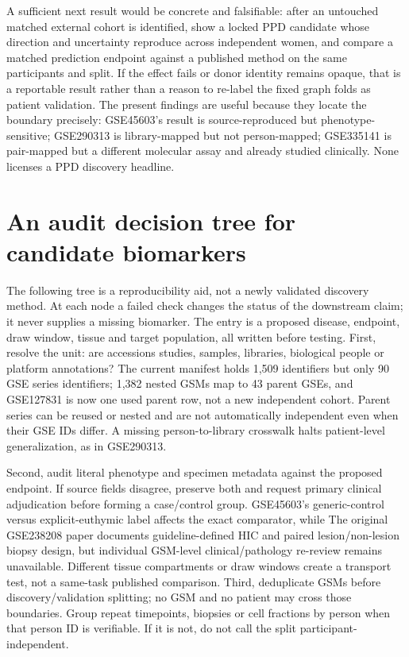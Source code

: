 \documentclass[11pt,a4paper]{article}
\begin{document}
A sufficient next result would be concrete and falsifiable: after an untouched matched external cohort is identified, show a locked PPD candidate whose direction and uncertainty reproduce across independent women, and compare a matched prediction endpoint against a published method on the same participants and split. If the effect fails or donor identity remains opaque, that is a reportable result rather than a reason to re-label the fixed graph folds as patient validation. The present findings are useful because they locate the boundary precisely: GSE45603's result is source-reproduced but phenotype-sensitive; GSE290313 is library-mapped but not person-mapped; GSE335141 is pair-mapped but a different molecular assay and already studied clinically. None licenses a PPD discovery headline.


\section{An audit decision tree for candidate biomarkers}
The following tree is a reproducibility aid, not a newly validated discovery method. At each node a failed check changes the status of the downstream claim; it never supplies a missing biomarker. The entry is a proposed disease, endpoint, draw window, tissue and target population, all written before testing. First, resolve the unit: are accessions studies, samples, libraries, biological people or platform annotations? The current manifest holds 1,509 identifiers but only 90 GSE series identifiers; 1,382 nested GSMs map to 43 parent GSEs, and GSE127831 is now one used parent row, not a new independent cohort. Parent series can be reused or nested and are not automatically independent even when their GSE IDs differ. A missing person-to-library crosswalk halts patient-level generalization, as in GSE290313.

Second, audit literal phenotype and specimen metadata against the proposed endpoint. If source fields disagree, preserve both and request primary clinical adjudication before forming a case/control group. GSE45603's generic-control versus explicit-euthymic label affects the exact comparator, while The original GSE238208 paper documents guideline-defined HIC and paired lesion/non-lesion biopsy design, but individual GSM-level clinical/pathology re-review remains unavailable. Different tissue compartments or draw windows create a transport test, not a same-task published comparison. Third, deduplicate GSMs before discovery/validation splitting; no GSM and no patient may cross those boundaries. Group repeat timepoints, biopsies or cell fractions by person when that person ID is verifiable. If it is not, do not call the split participant-independent.
\end{document}
